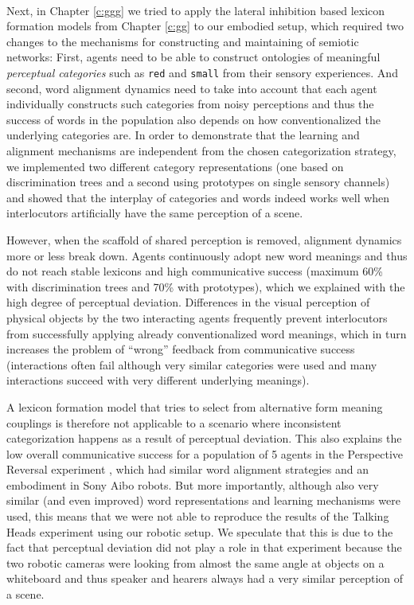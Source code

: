 ~\\

Next, in Chapter \ref{c:ggg} we tried to apply the lateral inhibition
based lexicon formation models from Chapter \ref{c:gg} to our embodied
setup, which required two changes to the mechanisms for constructing
and maintaining of semiotic networks: First, agents need to be able to
construct ontologies of meaningful \emph{perceptual categories} such
as \texttt{red} and \texttt{small} from their sensory experiences. And
second, word alignment dynamics need to take into account that each
agent individually constructs such categories from noisy perceptions
and thus the success of words in the population also depends on how
conventionalized the underlying categories are. In order to
demonstrate that the learning and alignment mechanisms are independent
from the chosen categorization strategy, we implemented two different
category representations (one based on discrimination trees and a
second using prototypes on single sensory channels) and showed that
the interplay of categories and words indeed works well when
interlocutors artificially have the same perception of a scene.


However, when the scaffold of shared perception is removed, alignment
dynamics more or less break down. Agents continuously adopt new word
meanings and thus do not reach stable lexicons and high communicative
success (maximum 60\% with discrimination trees and 70\% with
prototypes), which we explained with the high degree of perceptual
deviation. Differences in the visual perception of physical objects by
the two interacting agents frequently prevent interlocutors from
successfully applying already conventionalized word meanings, which in
turn increases the problem of ``wrong'' feedback from communicative
success (interactions often fail although very similar categories were
used and many interactions succeed with very different underlying
meanings).


A lexicon formation model that tries to select from alternative form
meaning couplings is therefore not applicable to a scenario where
inconsistent categorization happens as a result of perceptual
deviation. This also explains the low overall communicative success
for a population of 5 agents in the Perspective Reversal experiment
\citep*{steels09perspective-alignment,loetzsch08typological}, which
had similar word alignment strategies and an embodiment in Sony Aibo
robots. But more importantly, although also very similar (and even
improved) word representations and learning mechanisms were used, this
means that we were not able to reproduce the results of the Talking
Heads experiment \citep{steels99situated} using our robotic setup. We
speculate that this is due to the fact that perceptual deviation did
not play a role in that experiment because the two robotic cameras
were looking from almost the same angle at objects on a whiteboard and
thus speaker and hearers always had a very similar perception of a
scene.


